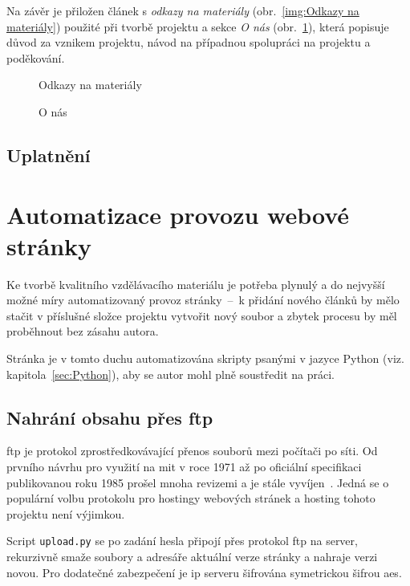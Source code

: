 \documentclass[a4paper, 12pt]{article}
\newcommand*{\fullref}[1]{\hyperref[{#1}]{\ref*{#1}}}
\begin{document}
  Na závěr je přiložen článek s \emph{odkazy na materiály} (obr.~\ref{img:Odkazy na materiály}) použité při tvorbě projektu a sekce \emph{O nás} (obr.~\ref{img:O nás}), která popisuje důvod za vznikem projektu, návod na případnou spolupráci na projektu a poděkování.

  \begin{figure}[H]
      \caption{Odkazy na materiály} \label{img:Odkazy na materiály}
    \endminipage\hfill
      \caption{O nás} \label{img:O nás}
    \endminipage
  \end{figure}


  \subsection{Uplatnění}

  \section{Automatizace provozu webové stránky} \label{sec:Automatizace provozu webové stránky}
  Ke tvorbě kvalitního vzdělávacího materiálu je potřeba plynulý a do nejvyšší možné míry automatizovaný provoz stránky~--~k přidání nového článků by mělo stačit v příslušné složce projektu vytvořit nový soubor a zbytek procesu by měl proběhnout bez zásahu autora.

  Stránka je v tomto duchu automatizována skripty psanými v jazyce Python (viz. kapitola~\fullref{sec:Python}), aby se autor mohl plně soustředit na práci.


  \subsection{Nahrání obsahu přes \acrshort{ftp}}
  \gls{ftp} je protokol zprostředkovávající přenos souborů mezi počítači po síti. Od prvního návrhu pro využití na \gls{mit} v roce 1971 až po oficiální specifikaci publikovanou roku 1985 prošel mnoha revizemi a je stále vyvíjen~\cite{ftp-specification}. Jedná se o populární volbu protokolu pro hostingy webových stránek a hosting tohoto projektu není výjimkou.

  Script \texttt{upload.py} se po zadání hesla připojí přes protokol \gls{ftp} na server, rekurzivně smaže soubory a adresáře aktuální verze stránky a nahraje verzi novou. Pro dodatečné zabezpečení je \gls{ip} serveru šifrována symetrickou šifrou \gls{aes}.
\end{document}
